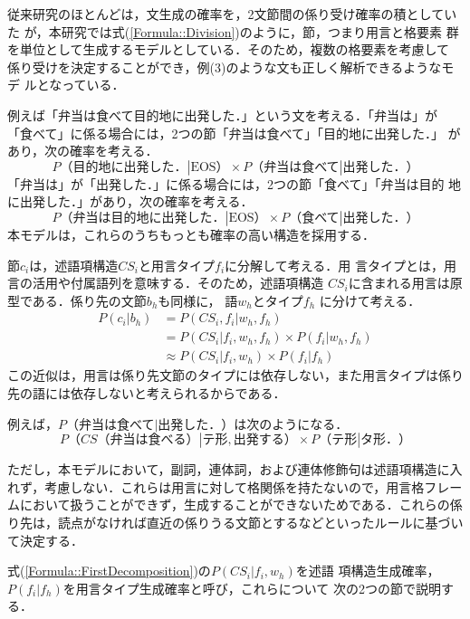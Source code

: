 \documentclass[japanese]{jnlp_1.3e}
\begin{document}
従来研究のほとんどは，文生成の確率を，2文節間の係り受け確率の積としていた
が，本研究では式(\ref{Formula::Division})のように，節，つまり用言と格要素
群を単位として生成するモデルとしている．そのため，複数の格要素を考慮して
係り受けを決定することができ，例(3)のような文も正しく解析できるようなモデ
ルとなっている．

例えば「弁当は食べて目的地に出発した．」という文を考える．「弁当は」が
「食べて」に係る場合には，2つの節「弁当は食べて」「目的地に出発した．」
があり，次の確率を考える．
\[
 P（\mbox{目的地に出発した．}|\mbox{EOS}） \times
	P（\mbox{弁当は食べて}|\mbox{出発した．}）
\]
「弁当は」が「出発した．」に係る場合には，2つの節「食べて」「弁当は目的
地に出発した．」があり，次の確率を考える．
\[
 P（\mbox{弁当は目的地に出発した．}|\mbox{EOS}） \times
	P（\mbox{食べて}|\mbox{出発した．}）
\]
本モデルは，これらのうちもっとも確率の高い構造を採用する．

節$c_i$は，述語項構造$\mathit{CS}_i$と用言タイプ$f_i$に分解して考える．用
言タイプとは，用言の活用や付属語列を意味する．そのため，述語項構造
$\mathit{CS}_i$に含まれる用言は原型である．係り先の文節$b_{h}$も同様に，
語$w_{h}$とタイプ$f_{h}$ に分けて考える．
\begin{align}
 P(c_i|b_{h}) & = P(\mathit{CS}_i, f_i|w_{h}, f_{h})  \nonumber\\
              & = P(\mathit{CS}_i|f_i,w_{h},f_{h}) \times P(f_i|w_{h},f_{h})  \nonumber\\
              & \approx P(\mathit{CS}_i|f_i,w_{h}) \times P(f_i|f_{h}) 
	\label{Formula::FirstDecomposition}
\end{align}
この近似は，用言は係り先文節のタイプには依存しない，また用言タイプは係り
先の語には依存しないと考えられるからである．

例えば，$P（\mbox{弁当は食べて}|\mbox{出発した．}）$は次のようになる．
\[
 P（\mathit{CS}（\mbox{弁当は食べる}）|\mbox{テ形},\mbox{出発する}）
	\times P（\mbox{テ形}|\mbox{タ形．}）
\]

ただし，本モデルにおいて，副詞，連体詞，および連体修飾句は述語項構造に入
れず，考慮しない．これらは用言に対して格関係を持たないので，用言格フレー
ムにおいて扱うことができず，生成することができないためである．これらの係
り先は，読点がなければ直近の係りうる文節とするなどといったルールに基づい
て決定する\cite{Kurohashi1994}．

式(\ref{Formula::FirstDecomposition})の$P(\mathit{CS}_i|f_i,w_{h})$を述語
項構造生成確率，$P(f_i|f_{h})$を用言タイプ生成確率と呼び，これらについて
次の2つの節で説明する．
\end{document}
